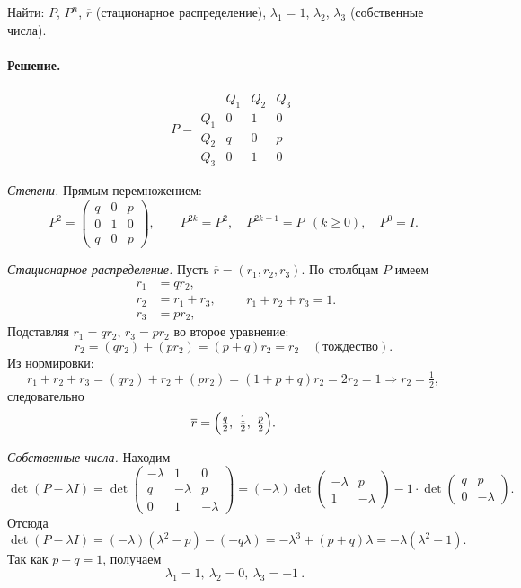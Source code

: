 Найти: $P$, $P^n$, $\overline{r}$ (стационарное распределение), $\lambda_1=1$, $\lambda_2$, $\lambda_3$ (собственные числа).

\paragraph{Решение.}

\[
	P =
	\begin{array}{c|ccc}
		    & Q_1 & Q_2 & Q_3 \\ \hline
		Q_1 & 0   & 1   & 0   \\
		Q_2 & q   & 0   & p   \\
		Q_3 & 0   & 1   & 0
	\end{array}
\]

\emph{Степени.} Прямым перемножением:
\[
	P^2=
	\begin{pmatrix}
		q & 0 & p \\
		0 & 1 & 0 \\
		q & 0 & p
	\end{pmatrix},
	\qquad
	P^{2k}=P^2,\quad P^{2k+1}=P\ \ (k\ge0),\quad P^0=I.
\]

\emph{Стационарное распределение.} Пусть $\overline r=(r_1,r_2,r_3)$.
По столбцам $P$ имеем
\[
	\begin{aligned}
		r_1 & = q r_2,     \\
		r_2 & = r_1 + r_3, \\
		r_3 & = p r_2,
	\end{aligned}
	\qquad r_1+r_2+r_3=1.
\]
Подставляя $r_1=q r_2$, $r_3=p r_2$ во второе уравнение:
\[
	r_2=(q r_2)+(p r_2)=(p+q)r_2=r_2 \quad(\text{тождество}).
\]
Из нормировки:
\[
	r_1+r_2+r_3=(q r_2)+r_2+(p r_2)=(1+p+q)r_2=2r_2=1 \Rightarrow r_2=\tfrac12,
\]
следовательно
\[
	\overline r=\Bigl(\tfrac{q}{2},\ \tfrac12,\ \tfrac{p}{2}\Bigr).
\]

\emph{Собственные числа.} Находим
\[
	\det(P-\lambda I)=
	\det\begin{pmatrix}
		-\lambda & 1        & 0        \\
		q        & -\lambda & p        \\
		0        & 1        & -\lambda
	\end{pmatrix}
	=(-\lambda)\!\det\!\begin{pmatrix}-\lambda&p\\[2pt]1&-\lambda\end{pmatrix}
	-1\cdot\det\!\begin{pmatrix}q&p\\[2pt]0&-\lambda\end{pmatrix}.
\]
Отсюда
\[
	\det(P-\lambda I)=(-\lambda)(\lambda^2-p) - ( -q\lambda )
	=-\lambda^3 + (p+q)\lambda
	=-\lambda(\lambda^2-1).
\]
Так как $p+q=1$, получаем
\[
	\boxed{\ \lambda_1=1,\ \lambda_2=0,\ \lambda_3=-1\ }.
\]

